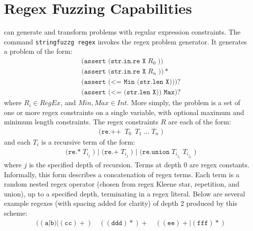 


    \section{Regex Fuzzing Capabilities}
    \vspace{-0.1in}
        \fuzzer{} can generate and transform problems with regular expression constraints. The command \texttt{stringfuzzg regex} invokes the regex problem generator. It generates a problem of the form: %
        \begingroup
        \footnotesize
        \begin{align*}
            & \texttt{(assert (str.in.re X}\; R_0\; \texttt{))} \\
            & \texttt{(assert (str.in.re X}\; R_n\; \texttt{))}* \\
            & \texttt{(assert (<= Min (str.len X)))}? \\
            & \texttt{(assert (<= (str.len X)) Max)}?
        \end{align*}
        \endgroup
        where $R_i \in RegEx$, and $Min, Max \in Int$. More simply, the problem is a set of one or more regex constraints on a single variable, with optional maximum and minimum length constraints. The regex constraints $R$ are each of the form:
        \begingroup
        \footnotesize
        \begin{align*}
            & \texttt{(re.++}\; \ T_0\; \  T_1\; \texttt{...}\; T_n\; \texttt{)}
        \end{align*}
        \endgroup
        and each $T_i$ is a recursive term of the form:
        \begingroup
        \footnotesize
        \begin{align*}
            & \texttt{(re.*}\; T_{i_j}\; \texttt{) | (re.+}\; T_{i_j}\; \texttt{) | (re.union}\; T_{i_{j_1}}\; T_{i_{j_2}}\; \texttt{)}
        \end{align*}
        \endgroup
        where $j$  is the specified depth of recursion. Terms at depth 0 are regex constants. Informally, this form describes a concatenation of regex terms. Each term is a random nested regex operator (chosen from regex Kleene star, repetition, and union), up to a specified depth, terminating in a regex literal. Below are several example regexes (with spacing added for clarity) of depth 2 produced by this scheme:
        \begingroup
        \footnotesize
        \begin{align*}
            & ((\texttt{a}|\texttt{b})|(\texttt{cc})+)\quad ((\texttt{ddd})*)+\quad ((\texttt{ee})+|(\texttt{fff})*)
        \end{align*}
        \endgroup

